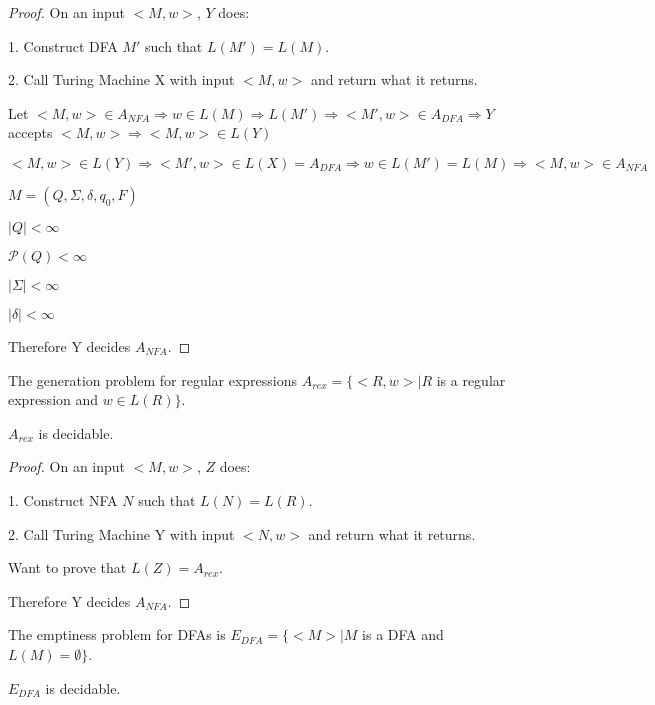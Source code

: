     \begin{proof}
        On an input $<M,w>$, $Y$ does:

        1. Construct DFA $M'$ such that $L(M')=L(M)$.

        2. Call Turing Machine X with input $<M,w>$ and return what it returns.


        Let $<M,w>\in A_{NFA} 
            \Rightarrow w\in L(M) 
            \Rightarrow L(M') 
            \Rightarrow <M',w>\in A_{DFA} 
            \Rightarrow Y$ accepts $<M,w> 
            \Rightarrow <M,w>\in L(Y)$

        $<M,w>\in L(Y) 
            \Rightarrow <M',w>\in L(X) = A_{DFA} 
            \Rightarrow w\in L(M') = L(M) 
            \Rightarrow <M,w>\in A_{NFA}$

        $M=(Q,\Sigma, \delta, q_0, F)$

            $|Q|<\infty$

            $\mathcal{P}(Q)<\infty$

            $|\Sigma|<\infty$

            $|\delta|<\infty$

        Therefore Y decides $A_{NFA}$.
    \end{proof}

    \begin{definition}
        The generation problem for regular expressions $A_{rex}=\{<R,w>|R$ is a regular expression and $w\in L(R)\}$.
    \end{definition}

    \begin{theorem}
        $A_{rex}$ is decidable.
    \end{theorem}

    \begin{proof}
        On an input $<M,w>$, $Z$ does:

        1. Construct NFA $N$ such that $L(N)=L(R)$.

        2. Call Turing Machine Y with input $<N,w>$ and return what it returns.


        Want to prove that $L(Z)=A_{rex}$.

        Therefore Y decides $A_{NFA}$.
    \end{proof}

    \begin{definition}
        The emptiness problem for DFAs is $E_{DFA} = \{<M>| M$ is a DFA and $L(M)=\emptyset \}$.
    \end{definition}

    \begin{theorem}
        $E_{DFA}$ is decidable.
    \end{theorem}

